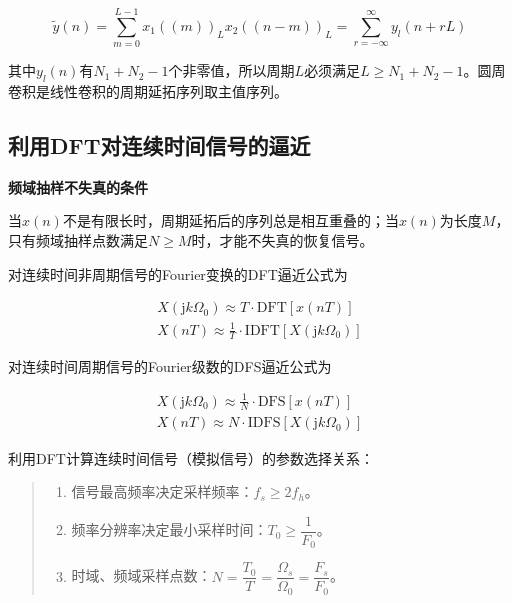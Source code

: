 \documentclass[cn, hazy, blue, normal, 14pt]{elegantnote}
\begin{document}
\begin{equation}
    \widetilde{y}(n)=\sum_{m=0}^{L-1}{x_1((m))_L x_2((n-m))_L}=\sum_{r=-\infty}^{\infty}{y_l(n+rL)}
\end{equation}

其中$y_l(n)$有$N_1+N_2-1$个非零值，所以周期$L$必须满足$L\geq N_1+N_2-1$。圆周卷积是线性卷积的周期延拓序列取主值序列。

\subsection{利用DFT对连续时间信号的逼近}

\textbf{频域抽样不失真的条件}

当$x(n)$不是有限长时，周期延拓后的序列总是相互重叠的；当$x(n)$为长度$M$，只有频域抽样点数满足$N\geq M$时，才能不失真的恢复信号。

对连续时间非周期信号的Fourier变换的DFT逼近公式为

\begin{equation}
\begin{aligned}
    X(\text{j}k\Omega_0)\approx T\cdot \text{DFT}[x(nT)] \\
    X(nT)\approx \frac{1}{T}\cdot \text{IDFT}[X(\text{j}k\Omega_0)]
\end{aligned}
\end{equation}

对连续时间周期信号的Fourier级数的DFS逼近公式为

\begin{equation}
\begin{aligned}
    X(\text{j}k\Omega_0)\approx \frac{1}{N}\cdot \text{DFS}[x(nT)] \\
    X(nT)\approx N\cdot \text{IDFS}[X(\text{j}k\Omega_0)]
\end{aligned}
\end{equation}

利用DFT计算连续时间信号（模拟信号）的参数选择关系：

\begin{quote}
\begin{enumerate}
    \item 信号最高频率决定采样频率：$f_s\geq 2f_h$。
    \item 频率分辨率决定最小采样时间：$T_0\geq \dfrac{1}{F_0}$。
    \item 时域、频域采样点数：$N=\dfrac{T_0}{T}=\dfrac{\Omega_s}{\Omega_0}=\dfrac{F_s}{F_0}$。
\end{enumerate}
\end{quote}
\end{document}
